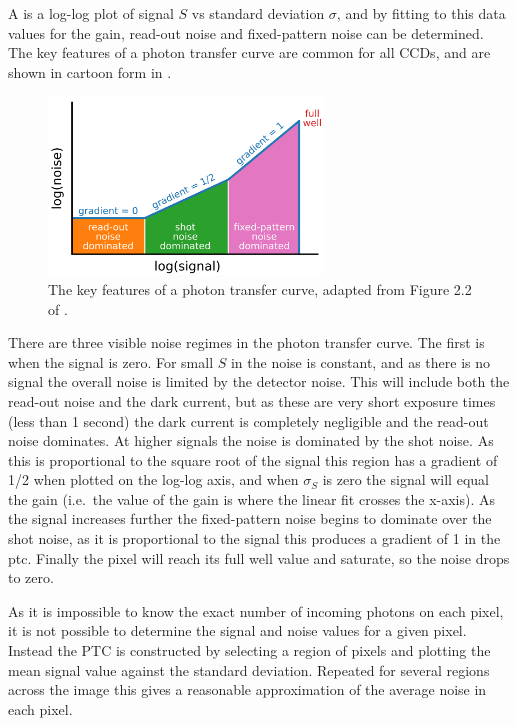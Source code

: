 \begin{colsection}
\begin{colsection}
A  is a log-log plot of signal $S$ vs standard deviation $\sigma$, and by fitting  to this data values for the gain, read-out noise and fixed-pattern noise can be determined. The key features of a photon transfer curve are common for all CCDs, and are shown in cartoon form in .

\newpage

\begin{figure}[t]
    \begin{center}
        \includegraphics[width=0.65\textwidth]{images/ptc.pdf}
    \end{center}
    \caption[Key features of the photon transfer curve]{
        The key features of a photon transfer curve, adapted from Figure 2.2 of \citet{CCDs}.
        }\label{fig:ptc_cartoon}
\end{figure}

There are three visible noise regimes in the photon transfer curve. The first is when the signal is zero. For small $S$ in  the noise is constant, and as there is no signal the overall noise is limited by the detector noise. This will include both the read-out noise and the dark current, but as these are very short exposure times (less than 1 second) the dark current is completely negligible and the read-out noise dominates. At higher signals the noise is dominated by the shot noise. As this is proportional to the square root of the signal this region has a gradient of 1/2 when plotted on the log-log axis, and when $\sigma_S$ is zero the signal will equal the gain (i.e.\ the value of the gain is where the linear fit crosses the x-axis). As the signal increases further the fixed-pattern noise begins to dominate over the shot noise, as it is proportional to the signal this produces a gradient of 1 in the \gls{ptc}. Finally the pixel will reach its full well value and saturate, so the noise drops to zero.

As it is impossible to know the exact number of incoming photons on each pixel, it is not possible to determine the signal and noise values for a given pixel. Instead the PTC is constructed by selecting a region of pixels and plotting the mean signal value against the standard deviation. Repeated for several regions across the image this gives a reasonable approximation of the average noise in each pixel.


\end{colsection}
\end{colsection}
